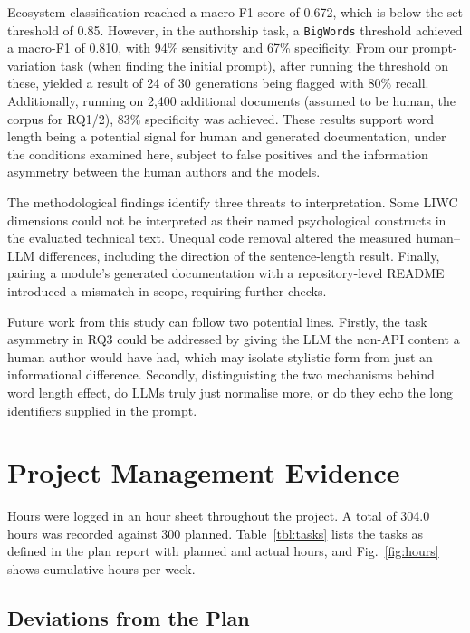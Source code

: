 \documentclass[conference]{IEEEtran}
\begin{document}
Ecosystem classification reached a macro-F1 score of 0.672, which is below the set threshold of 0.85. However, in the authorship task, a \texttt{BigWords} threshold achieved a macro-F1 of 0.810, with 94\% sensitivity and 67\% specificity. From our prompt-variation task (when finding the initial prompt), after running the threshold on these, yielded a result of 24 of 30 generations being flagged with 80\% recall. Additionally, running on 2{,}400 additional documents (assumed to be human, the corpus for RQ1/2), 83\% specificity was achieved. These results support word length being a potential signal for human and generated documentation, under the conditions examined here, subject to false positives and the information asymmetry between the human authors and the models.

The methodological findings identify three threats to interpretation. Some LIWC dimensions could not be interpreted as their named psychological constructs in the evaluated technical text. Unequal code removal altered the measured human--LLM differences, including the direction of the sentence-length result. Finally, pairing a module's generated documentation with a repository-level README introduced a mismatch in scope, requiring further checks.

Future work from this study can follow two potential lines. Firstly, the task asymmetry in RQ3 could be addressed by giving the LLM the non-API content a human author would have had, which may isolate stylistic form from just an informational difference. Secondly, distinguisting the two mechanisms behind word length effect, do LLMs truly just normalise more, or do they echo the long identifiers supplied in the prompt.





\appendix
\section{Project Management Evidence}
\label{annex:proj-mgmt}

Hours were logged in an hour sheet throughout the project. A total of 304.0 hours was recorded against 300 planned. Table~\ref{tbl:tasks} lists the tasks as defined in the plan report with planned and actual hours, and Fig.~\ref{fig:hours} shows cumulative hours per week.

\subsection{Deviations from the Plan}
\end{document}

